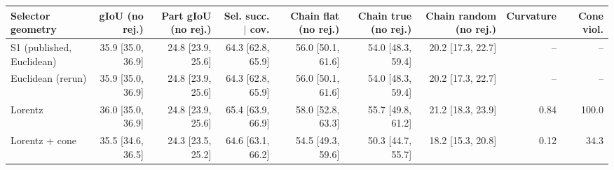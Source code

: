 \begin{tabular}{lrrrrrrrr}
\toprule
Selector geometry & gIoU (no rej.) & Part gIoU (no rej.) & Sel. succ. $\mid$ cov. & Chain flat (no rej.) & Chain true (no rej.) & Chain random (no rej.) & Curvature & Cone viol. \\
\midrule
S1 (published, Euclidean) & 35.9 \scriptsize{[35.0, 36.9]} & 24.8 \scriptsize{[23.9, 25.6]} & 64.3 \scriptsize{[62.8, 65.9]} & 56.0 \scriptsize{[50.1, 61.6]} & 54.0 \scriptsize{[48.3, 59.4]} & 20.2 \scriptsize{[17.3, 22.7]} & -- & -- \\
\midrule
Euclidean (rerun) & 35.9 \scriptsize{[35.0, 36.9]} & 24.8 \scriptsize{[23.9, 25.6]} & 64.3 \scriptsize{[62.8, 65.9]} & 56.0 \scriptsize{[50.1, 61.6]} & 54.0 \scriptsize{[48.3, 59.4]} & 20.2 \scriptsize{[17.3, 22.7]} & -- & -- \\
Lorentz & 36.0 \scriptsize{[35.0, 36.9]} & 24.8 \scriptsize{[23.9, 25.6]} & 65.4 \scriptsize{[63.9, 66.9]} & 58.0 \scriptsize{[52.8, 63.3]} & 55.7 \scriptsize{[49.8, 61.2]} & 21.2 \scriptsize{[18.3, 23.9]} & 0.84 & 100.0 \\
Lorentz + cone & 35.5 \scriptsize{[34.6, 36.5]} & 24.3 \scriptsize{[23.5, 25.2]} & 64.6 \scriptsize{[63.1, 66.2]} & 54.5 \scriptsize{[49.3, 59.6]} & 50.3 \scriptsize{[44.7, 55.7]} & 18.2 \scriptsize{[15.3, 20.8]} & 0.12 & 34.3 \\
\bottomrule
\end{tabular}
